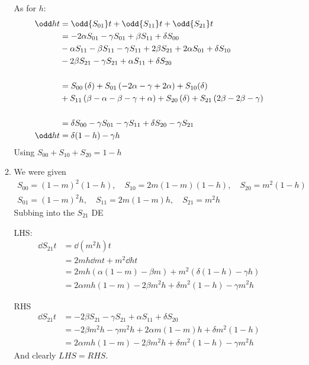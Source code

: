 \documentclass{X:/Documents/Coding/Latex/myassignment}
\begin{document}
\begin{enumerate}
\begin{enumerate}
		As for $h$:
		\begin{align*}
			\odd ht &= \odd{S_{01}}t + \odd {S_{11}} t + \odd{S_{21}} t\\
			&=- 2 \alpha S_{01} - \gamma S_{01} +\beta S_{11} + \delta S_{00} \\
			&- \alpha S_{11} -\beta S_{11} - \gamma S_{11} + 2 \beta S_{21} + 2\alpha S_{01} +  \delta S_{10}\\
			&- 2\beta S_{21} - \gamma S_{21} + \alpha S_{11} + \delta S_{20} \\\\
			&=S_{00} \left(\delta \right) + S_{01} \left(-2 \alpha - \gamma + 2 \alpha\right) + S_{10} (\delta) \\
			&+ S_{11} \left(\beta - \alpha - \beta - \gamma + \alpha\right) + S_{20} \left(\delta\right) + S_{21} \left(2 \beta - 2 \beta - \gamma \right)\\\\
			&=\delta S_{00}  - \gamma S_{01} - \gamma S_{11} + \delta S_{20} - \gamma S_{21}\\
			\odd ht &=\delta (1-h) - \gamma h
		\end{align*}
		Using $S_{00} + S_{10} + S_{20} = 1- h$

		\item 
		We were given
		\begin{align*}
			S_{00} = (1-m)^2(1-h), \quad S_{10} = 2m(1-m)(1-h), \quad S_{20} = m^2(1-h)\\
			S_{01} = (1-m)^2h, \quad S_{11} = 2m(1-m)h, \quad S_{21} = m^2h
		\end{align*}
		Subbing into the $S_{21}$ DE

		LHS:
		\begin{align*}
			\dd{S_{21}}{t} &=\dd{(m^2h)}{t}\\
			&=2mh \dd{m}{t} + m^2 \dd ht\\
			&=2mh (\alpha(1-m) - \beta m) + m^2 (\delta (1-h) - \gamma h) \\
			&=2 \alpha mh(1-m) - 2\beta m^2h + \delta m^2  (1-h) -\gamma m^2  h
		\end{align*}

		RHS
		\begin{align*}
			\dd{S_{21}}{t} &= - 2\beta S_{21} - \gamma S_{21} + \alpha S_{11} + \delta S_{20} \\
			&=- 2\beta m^2h - \gamma m^2h + 2\alpha m(1-m)h + \delta m^2(1-h) \\
			&=2 \alpha mh(1-m) - 2\beta m^2h + \delta m^2  (1-h) -\gamma m^2  h
		\end{align*}
		And clearly $LHS = RHS$.


\end{enumerate}
\end{enumerate}
\end{document}
